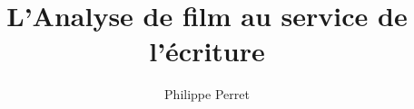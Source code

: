 \documentclass[11pt,french,twoside,a5paper]{book}
\title{L'Analyse de film au service de l'écriture}
\author{Philippe Perret}
\date{}
\begin{document}
\maketitle
\tableofcontents

\renewcommand{\bibname}{Filmographie}

\printindex
\end{document}
